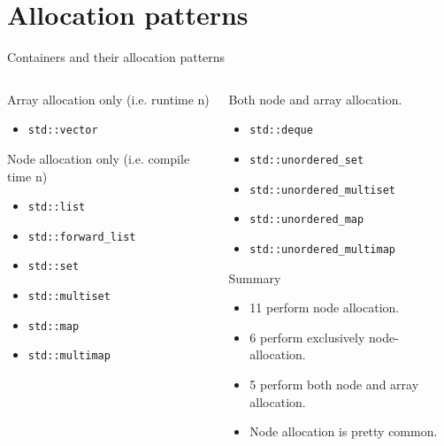 \documentclass[10pt,aspectratio=169]{beamer}
\begin{document}
\section{Allocation patterns}

\begin{frame}[fragile]{Containers and their allocation patterns}
\begin{columns}
\begin{column}{0.5\textwidth}
Array allocation only (i.e. runtime n)
\begin{itemize}
\item \texttt{std::vector}
\end{itemize}

Node allocation only (i.e. compile time n)
\begin{itemize}
\item \texttt{std::list}
\item \texttt{std::forward\_list}
\item \texttt{std::set}
\item \texttt{std::multiset}
\item \texttt{std::map}
\item \texttt{std::multimap}
\end{itemize}
\end{column}

\begin{column}{0.5\textwidth}
Both node and array allocation.
\begin{itemize}
\item \texttt{std::deque}
\item \texttt{std::unordered\_set}
\item \texttt{std::unordered\_multiset}
\item \texttt{std::unordered\_map}
\item \texttt{std::unordered\_multimap}
\end{itemize}
Summary
\begin{itemize}
\item 11 perform node allocation.
\item 6 perform exclusively node-allocation.
\item 5 perform both node and array allocation.
\item Node allocation is pretty common.
\end{itemize}

\end{column}
\end{columns}
\end{frame}
\end{document}

